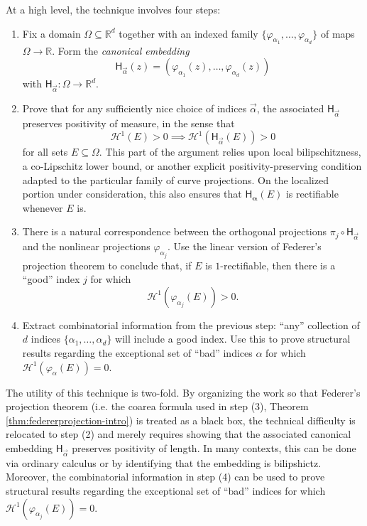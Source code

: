 \documentclass[12pt]{amsart}
\theoremstyle{definition}
\numberwithin{equation}{section}
\begin{document}
At a high level, the technique involves four steps:

\begin{enumerate}[(1)]
\setcounter{enumi}{0}
    \item Fix a domain $\Omega \subseteq\mathbb{R}^d$ together with an indexed family $\{\varphi_{\alpha_1}, \dots, \varphi_{\alpha_d}\}$ of maps $\Omega \to \mathbb{R}$. Form the \emph{canonical embedding} 
    $$\mathsf{H}_{\vec \alpha}(z) = \left(\varphi_{\alpha_1}(z), \dots, \varphi_{\alpha_d}(z)\right)$$
    with $\mathsf{H}_{\vec \alpha} : \Omega \to \mathbb{R}^d.$
    \item Prove that for any sufficiently nice choice of indices $\vec \alpha$, the associated $\mathsf{H}_{\vec \alpha}$ preserves positivity of measure, in the sense that
    $$\mathcal{H}^1(E) > 0 \implies \mathcal{H}^1(\mathsf{H}_{\vec \alpha}(E)) > 0$$
    for all sets $E \subseteq \Omega$. This part of the argument relies upon local bilipschitzness, a co-Lipschitz lower bound, or another explicit positivity-preserving condition adapted to the particular family of curve projections. On the localized portion under consideration, this also ensures that $\mathsf{H}_{\boldsymbol{\alpha}}(E)$ is rectifiable whenever $E$ is.
    \item There is a natural correspondence between the orthogonal projections $\pi_{j} \circ \mathsf{H}_{\vec \alpha}$ and the nonlinear projections $\varphi_{\alpha_j}$. Use the linear version of Federer's projection theorem to conclude that, if $E$ is $1$-rectifiable, then there is a ``good'' index $j$ for which $$\mathcal{H}^1(\varphi_{\alpha_j}(E)) > 0.$$
    \item Extract combinatorial information from the previous step: ``any'' collection of $d$ indices $\{\alpha_1, \dots, \alpha_d\}$ will include a good index. Use this to prove structural results regarding the exceptional set of ``bad'' indices $\alpha$ for which $\mathcal{H}^1(\varphi_{\alpha}(E)) = 0$. 
\end{enumerate}

The utility of this technique is two-fold. By organizing the work so that Federer's projection theorem (i.e. the coarea formula used in step (3), Theorem \ref{thm:federerprojection-intro}) is treated as a black box, the technical difficulty is relocated to step (2) and merely requires showing that the associated canonical embedding $\mathsf{H}_{\vec \alpha}$ preserves positivity of length. In many contexts, this can be done via ordinary calculus or by identifying that the embedding is bilipshictz. Moreover, the combinatorial information in step (4) can be used to prove structural results regarding the exceptional set of ``bad'' indices for which $\mathcal{H}^1(\varphi_{\alpha_j}(E)) = 0$.
\end{document}
